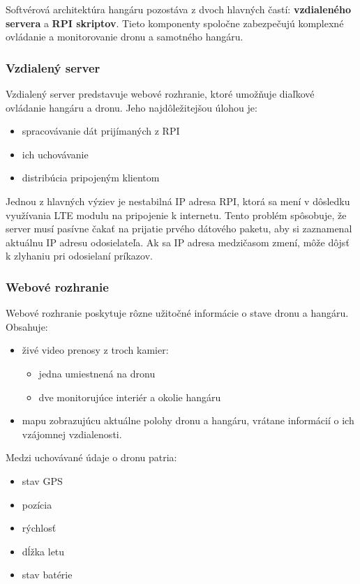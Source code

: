 \documentclass[a4paper]{article}
\begin{document}
    Softvérová architektúra hangáru pozostáva z dvoch hlavných častí: \textbf{vzdialeného servera} a \textbf{RPI skriptov}. Tieto komponenty spoločne zabezpečujú komplexné ovládanie a monitorovanie dronu a samotného hangáru.
    
    \subsubsection{Vzdialený server}
    Vzdialený server predstavuje webové rozhranie, ktoré umožňuje diaľkové ovládanie hangáru a dronu. Jeho najdôležitejšou úlohou je:
    \begin{itemize}
        \item spracovávanie dát prijímaných z RPI
        \item ich uchovávanie
        \item distribúcia pripojeným klientom
    \end{itemize}

    \noindent
    Jednou z hlavných výziev je nestabilná IP adresa RPI, ktorá sa mení v dôsledku využívania LTE modulu na pripojenie k internetu. Tento problém spôsobuje, že server musí pasívne čakať na prijatie prvého dátového paketu, aby si zaznamenal aktuálnu IP adresu odosielateľa. Ak sa IP adresa medzičasom zmení, môže dôjsť k zlyhaniu pri odosielaní príkazov.
    
    \subsubsection{Webové rozhranie}
    Webové rozhranie poskytuje rôzne užitočné informácie o stave dronu a hangáru. Obsahuje:
    \begin{itemize}
        \item živé video prenosy z troch kamier:
        \begin{itemize}
            \item jedna umiestnená na dronu
            \item dve monitorujúce interiér a okolie hangáru
        \end{itemize}
        \item mapu zobrazujúcu aktuálne polohy dronu a hangáru, vrátane informácií o ich vzájomnej vzdialenosti.
    \end{itemize}

    \noindent
    Medzi uchovávané údaje o dronu patria:
    \begin{itemize}[noitemsep, topsep=0pt]
        \item stav GPS
        \item pozícia
        \item rýchlosť
        \item dĺžka letu
        \item stav batérie
    \end{itemize}
    \vspace{.3cm}
\end{document}
